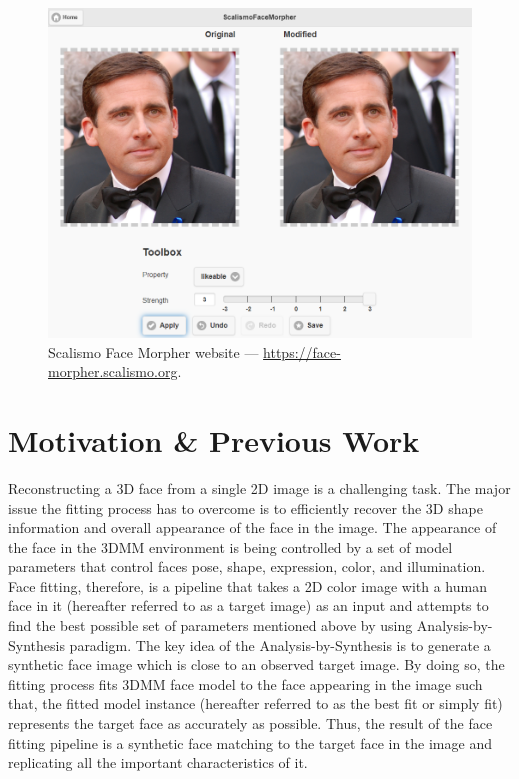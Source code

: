 \begin{figure}
    \centering
    \includegraphics[width=\textwidth]{Figures/site.PNG}
    \caption{Scalismo Face Morpher website — \url{https://face-morpher.scalismo.org}.}
    \label{f1.1}
\end{figure} 

\section{Motivation \& Previous Work} 
Reconstructing a 3D face from a single 2D image is a challenging task. The major issue the fitting process has to overcome is to efficiently recover the 3D shape information and overall appearance of the face in the image. The appearance of the face in the 3DMM environment is being controlled by a set of model parameters that control faces pose, shape, expression, color, and illumination. Face fitting, therefore, is a pipeline that takes a 2D color image with a human face in it (hereafter referred to as a target image) as an input and attempts to find the best possible set of parameters mentioned above by using Analysis-by-Synthesis paradigm\cite{Schoenborn2014,10.1007/978-3-642-40602-7_11}. The key idea of the Analysis-by-Synthesis is to generate a synthetic face image which is close to an observed target image. By doing so, the fitting process fits 3DMM face model to the face appearing in the image such that, the fitted model instance (hereafter referred to as the best fit or simply fit) represents the target face as accurately as possible. Thus, the result of the face fitting pipeline is a synthetic face matching to the target face in the image and replicating all the important characteristics of it.\bigskip

